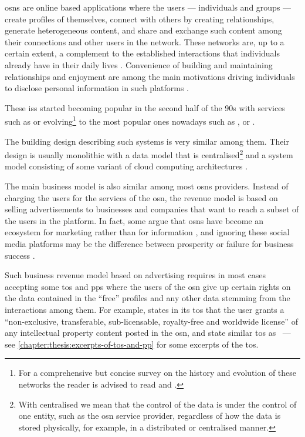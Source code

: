 \Acp{osn} are online based applications where the users --- individuals and groups 
--- create profiles of themselves, connect with others by creating relationships, 
generate heterogeneous content, and share and exchange such content among their 
connections and other users in the network. These networks are, up to a certain 
extent, a complement to the established interactions that individuals already have 
in their daily lives \cite{SubrahmanyamRWE08}. Convenience of building and maintaining 
relationships and enjoyment are among the main motivations driving individuals to 
disclose personal information in such platforms \cite{KrasnovaSKH10}.

These \acp{is} started becoming popular in the second half of the 90s 
with services such as \LiveJournal or \Friendster evolving\footnote{For a comprehensive 
but concise survey on the history and evolution of these networks the reader is 
advised to read \cite{boydE07} and \cite{HeidemannKP12}.} to the most popular ones 
nowadays such as \Facebook, \LinkedIn or \Twitter.

The building design describing such systems is very similar among them. Their design 
is usually monolithic with a data model that is centralised\footnote{With centralised 
we mean that the control of the data is under the control of one entity, such as 
the \ac{osn} service provider, regardless of how the data is stored physically, 
for example, in a distributed or centralised manner.} and a system model consisting 
of some variant of cloud computing architectures \cite{PallisZD11}. 

The main business model is also similar among most \acp{osn} providers. Instead 
of charging the users for the services of the \ac{osn}, the revenue model is based 
on selling advertisements to businesses and companies that want to reach a subset 
of the users in the platform. In fact, some argue that \acp{osn} have become an 
ecosystem for marketing rather than for information \cite{HannaRC11}, and ignoring 
these social media platforms may be the difference between prosperity or failure 
for business success \cite{HarrisR09}.

Such business revenue model based on advertising requires in most cases accepting 
some \ac{tos} and \acp{pp} where the users of the \ac{osn} give up certain rights 
on the data contained in the ``free'' profiles and any other data stemming from 
the interactions among them. For example, \Facebook states in its \ac{tos} that 
the user grants a ``non-exclusive, transferable, sub-licensable, royalty-free and 
worldwide license'' of any intellectual property content posted in the \ac{osn}, 
\LinkedIn and \Twitter state similar \ac{tos} as \Facebook~--- see \cref{chapter:thesis:excerpts-of-tos-and-pp} 
for some excerpts of the \ac{tos}.

